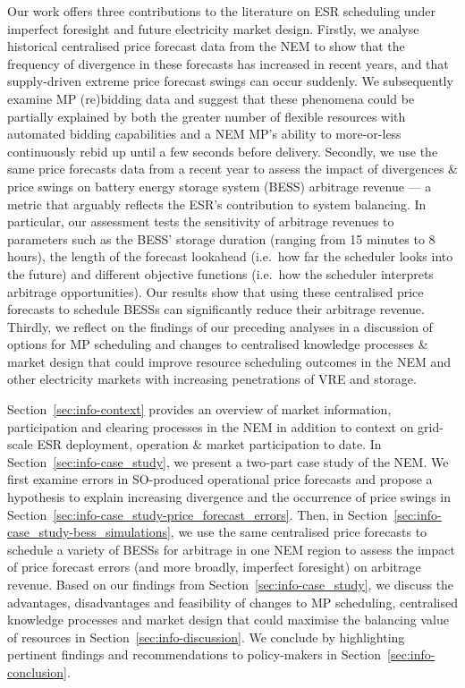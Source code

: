 \documentclass[12pt,a4paper,]{report}
\begin{document}
Our work offers three contributions to the literature on ESR scheduling
under imperfect foresight and future electricity market design. Firstly,
we analyse historical centralised price forecast data from the NEM to
show that the frequency of divergence in these forecasts has increased
in recent years, and that supply-driven extreme price forecast swings
can occur suddenly. We subsequently examine MP (re)bidding data and
suggest that these phenomena could be partially explained by both the
greater number of flexible resources with automated bidding capabilities
and a NEM MP's ability to more-or-less continuously rebid up until a few
seconds before delivery. Secondly, we use the same price forecasts data
from a recent year to assess the impact of divergences \& price swings
on battery energy storage system (BESS) arbitrage revenue --- a metric
that arguably reflects the ESR's contribution to system balancing. In
particular, our assessment tests the sensitivity of arbitrage revenues
to parameters such as the BESS' storage duration (ranging from 15
minutes to 8 hours), the length of the forecast lookahead (i.e.~how far
the scheduler looks into the future) and different objective functions
(i.e.~how the scheduler interprets arbitrage opportunities). Our results
show that using these centralised price forecasts to schedule BESSs can
significantly reduce their arbitrage revenue. Thirdly, we reflect on the
findings of our preceding analyses in a discussion of options for MP
scheduling and changes to centralised knowledge processes \& market
design that could improve resource scheduling outcomes in the NEM and
other electricity markets with increasing penetrations of VRE and
storage.

Section~\ref{sec:info-context} provides an overview of market
information, participation and clearing processes in the NEM in addition
to context on grid-scale ESR deployment, operation \& market
participation to date. In Section~\ref{sec:info-case_study}, we present
a two-part case study of the NEM. We first examine errors in SO-produced
operational price forecasts and propose a hypothesis to explain
increasing divergence and the occurrence of price swings in
Section~\ref{sec:info-case_study-price_forecast_errors}. Then, in
Section~\ref{sec:info-case_study-bess_simulations}, we use the same
centralised price forecasts to schedule a variety of BESSs for arbitrage
in one NEM region to assess the impact of price forecast errors (and
more broadly, imperfect foresight) on arbitrage revenue. Based on our
findings from Section~\ref{sec:info-case_study}, we discuss the
advantages, disadvantages and feasibility of changes to MP scheduling,
centralised knowledge processes and market design that could maximise
the balancing value of resources in Section~\ref{sec:info-discussion}.
We conclude by highlighting pertinent findings and recommendations to
policy-makers in Section~\ref{sec:info-conclusion}.
\end{document}
